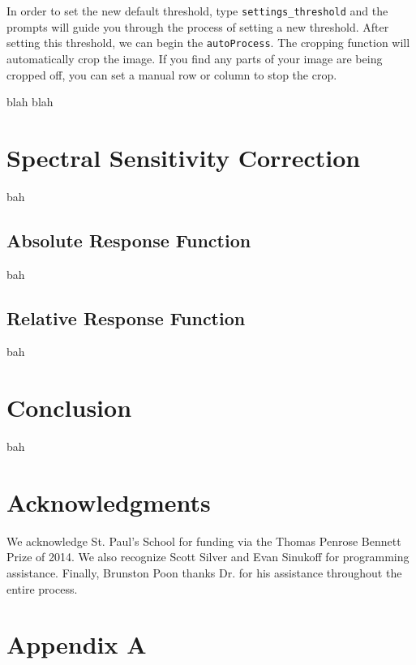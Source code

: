\documentclass[prb,preprint]{revtex4-1}
\begin{document}
	In order to set the new default threshold, type \verb|settings_threshold| and the prompts will guide you through the process of setting a new threshold. After setting this threshold, we can begin the \verb|autoProcess|. The cropping function will automatically crop the image. If you find any parts of your image are being cropped off, you can set a manual row or column to stop the crop.

	blah blah
\section{Spectral Sensitivity Correction}
	bah
	\subsection{Absolute Response Function}
		bah
	\subsection{Relative Response Function}
		bah
\section{Conclusion}
	bah

\section{Acknowledgments}
	We acknowledge St. Paul's School for funding via the Thomas Penrose Bennett Prize of 2014. We also recognize Scott Silver and Evan Sinukoff for programming assistance. Finally, Brunston Poon thanks Dr. \@Mathews for his assistance throughout the entire process.

\section{Appendix A}
\end{document}
